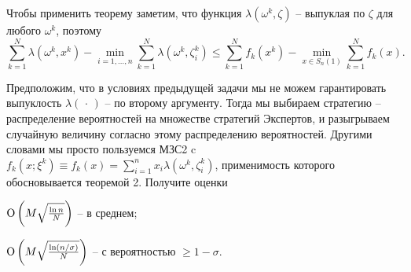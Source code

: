 \begin{ordre}
Чтобы применить теорему заметим, что функция $\lambda 
\left( {\omega ^k,\zeta } \right)$ -- выпуклая по $\zeta $ для любого 
$\omega ^k$, поэтому
\[
\sum\limits_{k=1}^N {\lambda \left( {\omega ^k,x^k} \right)} -\mathop {\min 
}\limits_{i=1,...,n} \sum\limits_{k=1}^N {\lambda \left( {\omega ^k,\zeta 
_i^k } \right)} \le \sum\limits_{k=1}^N {f_k \left( {x^k} \right)} -\mathop 
{\min }\limits_{x\in S_n \left( 1 \right)} \sum\limits_{k=1}^N {f_k \left( x 
\right)} .
\]
\end{ordre}

\begin{problem}
Предположим, что в условиях предыдущей задачи мы не можем 
гарантировать выпуклость $\lambda \left( {\,\cdot \,} \right)$ -- по второму 
аргументу. Тогда мы выбираем стратегию -- распределение вероятностей на 
множестве стратегий Экспертов, и разыгрываем случайную величину согласно 
этому распределению вероятностей. Другими словами мы просто пользуемся МЗС2 
c $f_k \left( {x;\xi ^k} \right)\equiv f_k \left( x 
\right)=\sum\limits_{i=1}^n {x_i \lambda \left( {\omega ^k,\zeta _i^k } 
\right)} $, применимость которого обосновывается теоремой 2. Получите оценки

${\rm O}\left( {M\sqrt {\frac{\ln n}{N}} } \right) $ -- в среднем;

${\rm 
O}\left( {M\sqrt {\frac{\ln \left( {n \mathord{\left/ {\vphantom {n \sigma 
}} \right. \kern-\nulldelimiterspace} \sigma } \right)}{N}} } \right)$ -- с 
вероятностью $\ge 1-\sigma $.

\end{problem}

